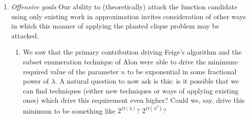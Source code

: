 \documentclass{article}
\theoremstyle{definition}
\begin{document}
\begin{enumerate}
\item{\textit{Offensive goals } 
Our ability to (theoretically) attack the function candidate using only existing 
work in approximation invites consideration of other ways in which this manner of applying 
the planted clique problem may be attacked.}
\begin{enumerate}
\item{We saw that the primary contribution driving Feige's algorithm and the 
subset enumeration technique of Alon were able to drive the minimum-required value 
of the parameter $n$ to be exponential in some fractional power of $\lambda$.  A natural question 
to now ask is this: is it possible that we can find techniques (either new techniques or 
ways of applying existing ones) 
which drive this requirement even higher?  Could we, say, drive this minimum to be something 
like $2^{\Omega(\lambda)}$?  $2^{\Omega(\lambda^2)}$?

}
\end{enumerate}
\end{enumerate}
\end{document}
